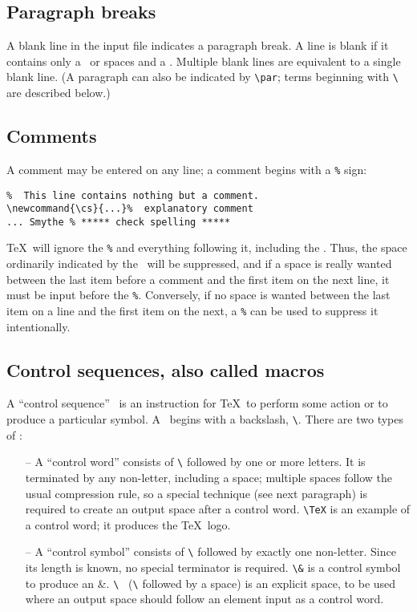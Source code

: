 \subsection{Paragraph breaks}

A blank line in the input file indicates a paragraph break.  A line is
blank if it contains only a \CR\ or spaces and a \CR.  Multiple blank
lines are equivalent to a single blank line.  (A paragraph can also be
indicated by \verb|\par|; terms beginning with \verb|\| are described below.)

\subsection{Comments}

A comment may be entered on any line; a comment begins with a \verb|%| sign:
\begin{verbatim}
%  This line contains nothing but a comment.
\newcommand{\cs}{...}%  explanatory comment
... Smythe % ***** check spelling *****
\end{verbatim}
\TeX\ will ignore the \verb|%| and everything following it, including the \CR.
Thus, the space ordinarily indicated by the \CR\ will be suppressed,
and if a space is really wanted between the last item before a comment
and the first item on the next line, it must be input before the \verb|%|.
Conversely, if no space is wanted between the last item on a line and
the first item on the next, a \verb|%| can be used to suppress it
intentionally.

\subsection{Control sequences, also called macros}

A ``control sequence'' \cs\ is an instruction for \TeX\ to perform
some action or to produce a particular symbol.  A \cs\ begins with a
backslash, \verb|\|.  There are two types of \css:
\begin{itemize}
\item[--] A ``control word'' consists of \verb|\| followed by one or more
        letters.  It is terminated by any non-letter, including a space;
        multiple spaces follow the usual compression rule, so a
        special technique (see next paragraph) is required to create an
        output space after a control word.  \verb|\TeX| is an example of
        a control word; it produces the \TeX\ logo.
\item[--] A ``control symbol'' consists of \verb|\| followed by exactly one
        non-letter.  Since its length is known, no special terminator
        is required.  \verb|\&| is a control symbol to produce an \&.
        \verb*|\ | (\verb|\| followed by a space) is an explicit space, to
        be used where an output space should follow an element
        input as a control word.
\end{itemize}

